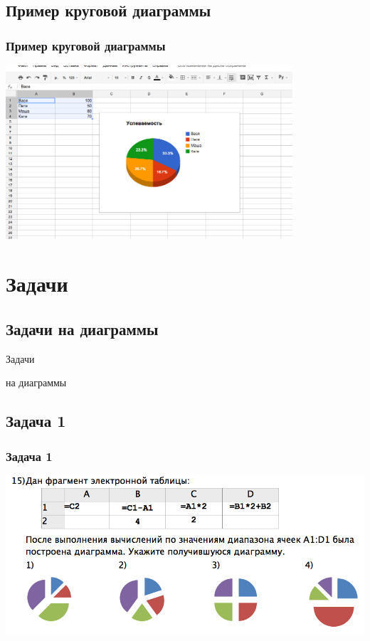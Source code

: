 \documentclass[compress,red]{beamer}
\begin{document}
\subsection{Пример круговой диаграммы}
\begin{frame}[fragile]
  \frametitle{Пример круговой диаграммы}
  \centerline{\includegraphics[width=0.8\textwidth]{images/06.png}}
\end{frame}

\section{Задачи}
\subsection{Задачи на диаграммы}
\begin{frame}
  \begin{center}
    \Huge{Задачи}
  \end{center}
  \begin{center}
    \Large{на диаграммы}
  \end{center}
\end{frame}

\subsection{Задача 1}
\begin{frame}[fragile]
  \frametitle{Задача 1}
  \centerline{\includegraphics[width=1.0\textwidth]{images/07.png}}
\end{frame}
\end{document}
